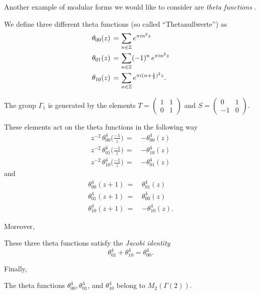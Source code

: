 Another example of modular forms we would like to consider are \emph{theta functions} \cite[Section~3.1]{1-2-3}.
\begin{definition}\label{def-th00-th01-th10}
We define three different theta functions (so called ``Thetanullwerte'') as
\begin{align}
  \theta_{00}(z)\,=\, & \sum_{n\in\mathbb{Z}}e^{\pi i n^2 z} \notag \\
  \theta_{01}(z)\,=\, & \sum_{n\in\mathbb{Z}}(-1)^n\,e^{\pi i n^2 z} \notag \\
  \theta_{10}(z)\,=\, & \sum_{n\in\mathbb{Z}}e^{\pi i (n+\frac12)^2 z}. \notag
\end{align}
\end{definition}
The group $\Gamma_1$ is generated by the elements $T=\left(\begin{smallmatrix}1&1\\0&1\end{smallmatrix}\right)$ and $S=\left(\begin{smallmatrix}0&1\\-1&0\end{smallmatrix}\right)$.
\begin{lemma}\label{lemma-theta-transform-S-T}
These elements act on the theta functions in the following way
\begin{align}
z^{-2}\,\theta^4_{00}\Big(\frac{-1}{z}\Big)\,=\,&-\theta_{00}^4(z) \label{eqn: theta transform S}\\
z^{-2}\,\theta^4_{01}\Big(\frac{-1}{z}\Big)\,=\,&-\theta_{10}^4(z)\\
z^{-2}\,\theta^4_{10}\Big(\frac{-1}{z}\Big)\,=\,&-\theta_{01}^4(z)
\end{align}
and
\begin{align}
\theta^4_{00}(z+1)\,=\,&\theta_{01}^4(z)\\
\theta^4_{01}(z+1)\,=\,&\theta_{00}^4(z)\\
\theta^4_{10}(z+1)\,=\,&-\theta_{10}^4(z). \label{eqn: theta transform T}
\end{align}
\end{lemma}
Moreover,
\begin{lemma}\label{lemma-theta-functions-jacobi-identity}
 These three theta functions satisfy the \emph{Jacobi identity}
\begin{equation}
\theta_{01}^4+\theta_{10}^4=\theta_{00}^4.
\end{equation}
\end{lemma}
Finally,
\begin{lemma}\label{lemma-theta-functions-modular-forms}
    The theta functions $\theta^4_{00},\theta^4_{01}$, and $\theta^4_{10}$ belong to $M_2(\Gamma(2))$.
\end{lemma}


